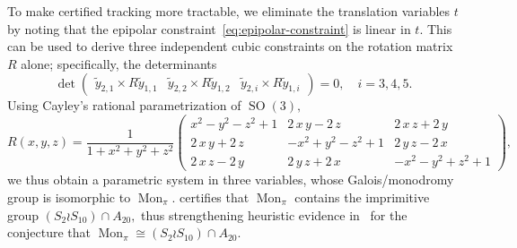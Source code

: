 \documentclass[11pt]{amsart}
\theoremstyle{definition}
\theoremstyle{remark}
\DeclareMathOperator{\Mon}{Mon}
\begin{document}
To make certified tracking more tractable, we eliminate the translation variables $t$ by noting that the epipolar constraint~\eqref{eq:epipolar-constraint} is linear in $t$. This can be used to derive three independent cubic constraints on the rotation matrix $R$ alone; specifically, the determinants 
\begin{equation}
\det 
\left(
\begin{array}{c|c|c}
\tilde{y}_{2,1} \times R \tilde{y}_{1,1}
& 
\tilde{y}_{2,2} \times R \tilde{y}_{1,2}
& 
\tilde{y}_{2,i} \times R \tilde{y}_{1,i}
\end{array}\right) =0,
\quad 
i=3,4,5.
\end{equation}
Using Cayley's rational parametrization of $\operatorname{SO} (3),$ 
\begin{equation}
R(x,y,z) = 
\displaystyle\frac{1}{1+x^2+y^2+z^2}  \left(\!\begin{array}{ccc}
     x^{2}-y^{2}-z^{2}+1&2\,x\,y-2\,z&2\,x\,z+2\,y\\
     2\,x\,y+2\,z&-x^{2}+y^{2}-z^{2}+1&2\,y\,z-2\,x\\
     2\,x\,z-2\,y&2\,y\,z+2\,x&-x^{2}-y^{2}+z^{2}+1
     \end{array}\!\right),
\end{equation}
we thus obtain a parametric system in three variables, whose Galois/monodromy group is isomorphic to $\Mon_\pi.$
 certifies that $\Mon_\pi$ contains the imprimitive group $(S_2 \wr S_{10}) \cap A_{20},$ thus strengthening heuristic evidence in~\cite[\S 4]{duff2022galois} for the conjecture that $\Mon_\pi \cong (S_2 \wr S_{10}) \cap A_{20}$.












\end{document}
